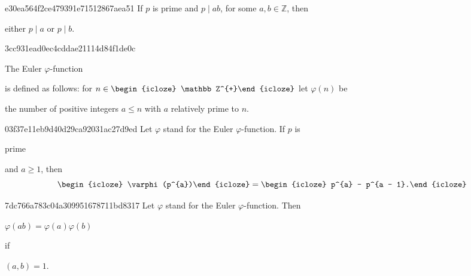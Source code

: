 \begin{note}{e30ea564f2ce479391e71512867aea51}
    If \({ p }\) is prime and \({ p \mid ab }\), for some \({ a, b \in \mathbb Z }\), then
    \begin{icloze}{1}
        \begin{center}
            either \({ p \mid a }\) or \({ p \mid b }\).
        \end{center}
    \end{icloze}
\end{note}

\begin{note}{3cc931ead0ec4cddae21114d84f1de0c}
    \begin{icloze}{3}The Euler \({ \varphi }\)-function\end{icloze} is defined as follows: for \({ n \in \begin{icloze}{2}\mathbb Z^{+}\end{icloze} }\) let \({ \varphi(n) }\) be \begin{icloze}{1}the number of positive integers \({ a \leq n }\) with \({ a }\) relatively prime to \({ n }\).\end{icloze}
\end{note}

\begin{note}{03f37e11eb9d40d29ca92031ac27d9ed}
    Let \({ \varphi }\) stand for the Euler \({ \varphi }\)-function.
    If \({ p }\) is \begin{icloze}{3}prime\end{icloze} and \({ a \geq 1 }\), then
    \[
        \begin{icloze}{2}\varphi(p^{a})\end{icloze} = \begin{icloze}{1}p^{a} - p^{a - 1}.\end{icloze}
    \]
\end{note}

\begin{note}{7dc766a783c04a309951678711bd8317}
    Let \({ \varphi }\) stand for the Euler \({ \varphi }\)-function.
    Then
    \begin{center}
        \begin{icloze}{1}\({ \varphi(ab) = \varphi(a) \varphi(b) }\)\end{icloze} \quad if \begin{icloze}{2}\({ (a, b) = 1 }\).\end{icloze}
    \end{center}
\end{note}

